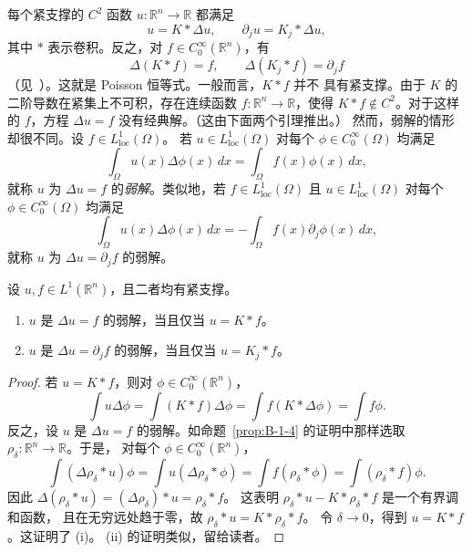 每个紧支撑的 $C^2$ 函数 $u:\mathbb R^n\to\mathbb R$ 都满足
\[
  u=K*\Delta u,\qquad \partial_j u=K_j*\Delta u,
\]
其中 $*$ 表示卷积。反之，对 $f\in C_0^\infty(\mathbb R^n)$，有
\[
  \Delta(K*f)=f,\qquad \Delta(K_j*f)=\partial_jf
\]
（见~）。这就是 Poisson 恒等式。一般而言，$K*f$ 并不
具有紧支撑。由于 $K$ 的二阶导数在紧集上不可积，存在连续函数
$f:\mathbb R^n\to\mathbb R$，使得 $K*f\notin C^2$。对于这样的
$f$，方程 $\Delta u=f$ 没有经典解。（这由下面两个引理推出。）
然而，弱解的情形却很不同。设 $f\in L^1_{\mathrm{loc}}(\Omega)$。
若 $u\in L^1_{\mathrm{loc}}(\Omega)$ 对每个
$\phi\in C_0^\infty(\Omega)$ 均满足
\[
  \int_\Omega u(x)\Delta\phi(x)\,dx
  =\int_\Omega f(x)\phi(x)\,dx,
\]
就称 $u$ 为 $\Delta u=f$ 的\emph{弱解}。类似地，若
$f\in L^1_{\mathrm{loc}}(\Omega)$ 且 $u\in L^1_{\mathrm{loc}}(\Omega)$
对每个 $\phi\in C_0^\infty(\Omega)$ 均满足
\[
  \int_\Omega u(x)\Delta\phi(x)\,dx
  =-\int_\Omega f(x)\partial_j\phi(x)\,dx,
\]
就称 $u$ 为 $\Delta u=\partial_jf$ 的弱解。

\begin{lemma}\label{lem:B-2-2}
设 $u,f\in L^1(\mathbb R^n)$，且二者均有紧支撑。
\begin{enumerate}[label=(\roman*)]
\item $u$ 是 $\Delta u=f$ 的弱解，当且仅当 $u=K*f$。
\item $u$ 是 $\Delta u=\partial_jf$ 的弱解，当且仅当 $u=K_j*f$。
\end{enumerate}
\end{lemma}

\begin{proof}
若 $u=K*f$，则对 $\phi\in C_0^\infty(\mathbb R^n)$，
\[
  \int u\Delta\phi
  =\int(K*f)\Delta\phi
  =\int f(K*\Delta\phi)
  =\int f\phi.
\]
反之，设 $u$ 是 $\Delta u=f$ 的弱解。如命题~\ref{prop:B-1-4}
的证明中那样选取 $\rho_\delta:\mathbb R^n\to\mathbb R$。于是，
对每个 $\phi\in C_0^\infty(\mathbb R^n)$，
\[
  \int(\Delta\rho_\delta*u)\phi
  =\int u(\Delta\rho_\delta*\phi)
  =\int f(\rho_\delta*\phi)
  =\int(\rho_\delta*f)\phi.
\]
因此 $\Delta(\rho_\delta*u)=(\Delta\rho_\delta)*u=\rho_\delta*f$。
这表明 $\rho_\delta*u-K*\rho_\delta*f$ 是一个有界调和函数，
且在无穷远处趋于零，故 $\rho_\delta*u=K*\rho_\delta*f$。
令 $\delta\to0$，得到 $u=K*f$。这证明了 (i)。
(ii) 的证明类似，留给读者。
\end{proof}

